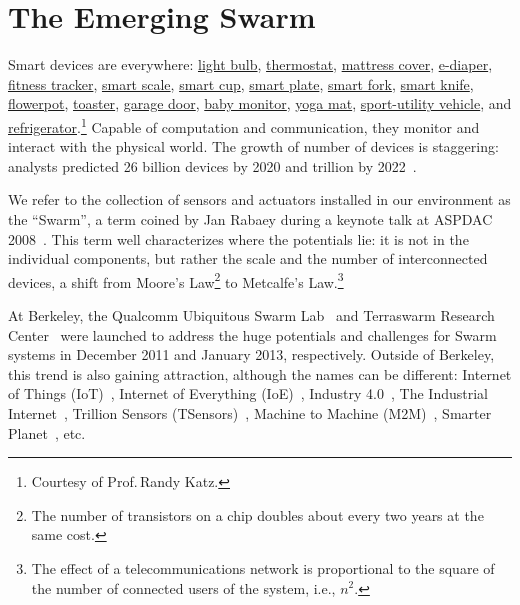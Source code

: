 \section{The Emerging Swarm}
\label{sec:emerging-swarm}

Smart devices are everywhere: \href{http://ilumi.co/}{light bulb},
\href{https://nest.com/}{thermostat}, \href{http://lunasleep.com/}{mattress
  cover}, \href{https://www.indiegogo.com/projects/smart-diapers}{e-diaper},
\href{https://www.fitbit.com/}{fitness tracker},
\href{https://www.fitbit.com/aria}{smart scale},
\href{https://www.myvessyl.com/}{smart cup},
\href{https://www.kickstarter.com/projects/1816678675/smartplate-instantly-track-and-analyze-everything}{smart
  plate},
\href{http://www.amazon.com/HAPILABS-102-HAPIfork-Bluetooth-Enabled-Smart/dp/B00FRPCPEC}{smart
  fork}, \href{http://electroluxdesignlab.com/en/submission/smart-knife/}{smart
  knife},
\href{http://www.clickandgrow.com/pages/what-is-click-grow}{flowerpot},
\href{http://www.williams-sonoma.com/products/breville-die-cast-2-slice-stainless-steel-smart-toaster/}{toaster},
\href{https://garageio.com/}{garage door},
\href{http://www2.withings.com/us/en/products/baby/smart-baby-monitor}{baby
  monitor},
\href{https://www.indiegogo.com/projects/smartmat-the-world-s-first-intelligent-yoga-mat}{yoga
  mat},
\href{http://usnews.rankingsandreviews.com/cars-trucks/best-cars-blog/2013/02/2015_GM_Vehicles_Will_Get_Wi-Fi_Internet_Access/}{sport-utility
  vehicle}, and
\href{http://www.samsung.com/us/appliances/refrigerators/RF28HMELBSR/AA}{refrigerator}.\footnote{Courtesy
  of Prof.\,Randy Katz.} Capable of computation and communication, they monitor
and interact with the physical world.  The growth of number of devices is
staggering: analysts predicted 26 billion devices by 2020 and trillion by
2022~\cite{middleton2013forecast}.

We refer to the collection of sensors and actuators installed in our environment
as the ``Swarm'', a term coined by Jan Rabaey during a keynote talk at ASPDAC
2008~\cite{rabaey2008brand}. This term well characterizes where the potentials
lie: it is not in the individual components, but rather the scale and the number
of interconnected devices, a shift from Moore's Law\footnote{The number of
  transistors on a chip doubles about every two years at the same cost.} to
Metcalfe's Law.\footnote{The effect of a telecommunications network is
  proportional to the square of the number of connected users of the system,
  i.e., $n^2$.}

At Berkeley, the Qualcomm Ubiquitous Swarm Lab~\cite{swarmlab} and Terraswarm
Research Center~\cite{terraswarm} were launched to address the huge potentials
and challenges for Swarm systems in December 2011 and January 2013,
respectively. Outside of Berkeley, this trend is also gaining attraction,
although the names can be different: Internet of Things
(IoT)~\cite{atzori2010internet}, Internet of Everything
(IoE)~\cite{bradley2013internet}, Industry 4.0~\cite{lasi2014industry}, The
Industrial Internet~\cite{eigner2018industrial}, Trillion Sensors
(TSensors)~\cite{bogue2014towards}, Machine to Machine
(M2M)~\cite{anton2014machine}, Smarter Planet~\cite{palmisano2008smarter}, etc.

